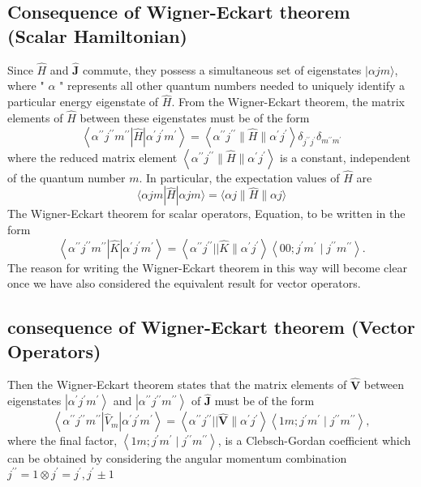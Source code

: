 \documentclass[12pt,a4paper]{article}
\begin{document}
\subsection{Consequence of Wigner-Eckart theorem (Scalar Hamiltonian)}
Since $\hat{H}$ and $\hat{\boldsymbol{J}}$ commute, they possess a simultaneous set of eigenstates $|\alpha j m\rangle$, where " $\alpha$ " represents all other quantum numbers needed to uniquely identify a particular energy eigenstate of $\hat{H}$. From the Wigner-Eckart theorem, the matrix elements of $\hat{H}$ between these eigenstates must be of the form
$$
\left\langle\alpha^{\prime \prime} j^{\prime \prime} m^{\prime \prime}|\hat{H}| \alpha^{\prime} j^{\prime} m^{\prime}\right\rangle=\left\langle\alpha^{\prime \prime} j^{\prime \prime}\|\hat{H}\| \alpha^{\prime} j^{\prime}\right\rangle \delta_{j^{\prime \prime} j^{\prime}} \delta_{m^{\prime \prime} m^{\prime}}
$$
where the reduced matrix element $\left\langle\alpha^{\prime \prime} j^{\prime \prime}\|\hat{H}\| \alpha^{\prime} j^{\prime}\right\rangle$ is a constant, independent of the quantum number $m$. In particular, the expectation values of $\hat{H}$ are
$$
\langle\alpha j m|\hat{H}| \alpha j m\rangle=\langle\alpha j\|\hat{H}\| \alpha j\rangle
$$
The Wigner-Eckart theorem for scalar operators, Equation, to be written in the form
$$
\left\langle\alpha^{\prime \prime} j^{\prime \prime} m^{\prime \prime}|\hat{K}| \alpha^{\prime} j^{\prime} m^{\prime}\right\rangle=\left\langle\alpha^{\prime \prime} j^{\prime \prime}|| \hat{K} \| \alpha^{\prime} j^{\prime}\right\rangle\left\langle 00 ; j^{\prime} m^{\prime} \mid j^{\prime \prime} m^{\prime \prime}\right\rangle .
$$
The reason for writing the Wigner-Eckart theorem in this way will become clear once we have also considered the equivalent result for vector operators.
\subsection{consequence of Wigner-Eckart theorem (Vector Operators)}
Then the Wigner-Eckart theorem states that the matrix elements of $\hat{\boldsymbol{V}}$ between eigenstates $\left|\alpha^{\prime} j^{\prime} m^{\prime}\right\rangle$ and $\left|\alpha^{\prime \prime} j^{\prime \prime} m^{\prime \prime}\right\rangle$ of $\hat{\boldsymbol{J}}$ must be of the form
$$
\left\langle\alpha^{\prime \prime} j^{\prime \prime} m^{\prime \prime}\left|\hat{V}_m\right| \alpha^{\prime} j^{\prime} m^{\prime}\right\rangle=\left\langle\alpha^{\prime \prime} j^{\prime \prime}|| \hat{\boldsymbol{V}} \| \alpha^{\prime} j^{\prime}\right\rangle\left\langle 1 m ; j^{\prime} m^{\prime} \mid j^{\prime \prime} m^{\prime \prime}\right\rangle,
$$
where the final factor, $\left\langle 1 m ; j^{\prime} m^{\prime} \mid j^{\prime \prime} m^{\prime \prime}\right\rangle$, is a Clebsch-Gordan coefficient which can be obtained by considering the angular momentum combination $j^{\prime \prime}=1 \otimes j^{\prime}=j^{\prime}, j^{\prime} \pm 1$
\end{document}
